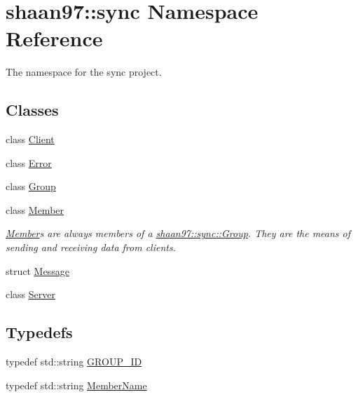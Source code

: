 \hypertarget{namespaceshaan97_1_1sync}{}\section{shaan97\+:\+:sync Namespace Reference}
\label{namespaceshaan97_1_1sync}


The namespace for the sync project.  


\subsection*{Classes}
\begin{DoxyCompactItemize}
\item 
class \hyperlink{classshaan97_1_1sync_1_1_client}{Client}
\item 
class \hyperlink{classshaan97_1_1sync_1_1_error}{Error}
\item 
class \hyperlink{classshaan97_1_1sync_1_1_group}{Group}
\item 
class \hyperlink{classshaan97_1_1sync_1_1_member}{Member}
\begin{DoxyCompactList}\small\item\em {\ttfamily \hyperlink{classshaan97_1_1sync_1_1_member}{Member}}s are always members of a {\ttfamily \hyperlink{classshaan97_1_1sync_1_1_group}{shaan97\+::sync\+::\+Group}}. They are the means of sending and receiving data from clients. \end{DoxyCompactList}\item 
struct \hyperlink{structshaan97_1_1sync_1_1_message}{Message}
\item 
class \hyperlink{classshaan97_1_1sync_1_1_server}{Server}
\end{DoxyCompactItemize}
\subsection*{Typedefs}
\begin{DoxyCompactItemize}
\item 
typedef std\+::string \hyperlink{namespaceshaan97_1_1sync_a34cebf175d27dfc3d82f24608f7043c1}{G\+R\+O\+U\+P\+\_\+\+ID}
\item 
typedef std\+::string \hyperlink{namespaceshaan97_1_1sync_af59c2c9185f7cde547b79fbe0bf8ec71}{Member\+Name}
\end{DoxyCompactItemize}

